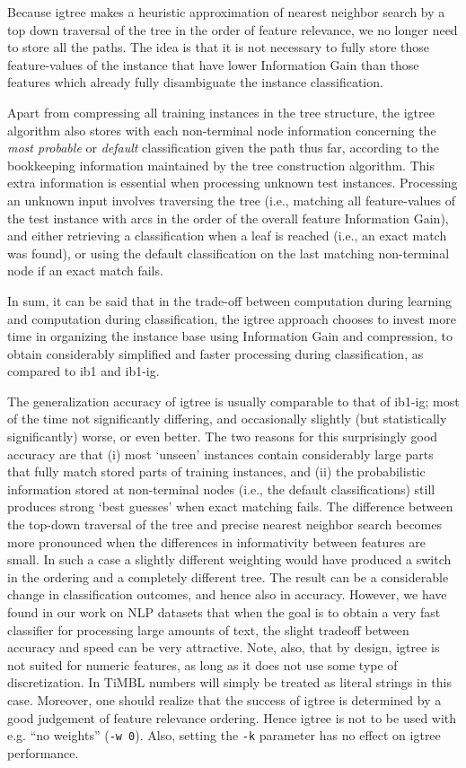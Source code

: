 \documentclass{report}
\begin{document}
Because {\sc igtree} makes a heuristic approximation of nearest
neighbor search by a top down traversal of the tree in the order of
feature relevance, we no longer need to store all the paths. The idea
is that it is not necessary to fully store those feature-values of the
instance that have lower Information Gain than those features which
already fully disambiguate the instance classification.

Apart from compressing all training instances in the tree structure,
the {\sc igtree} algorithm also stores with each non-terminal node
information concerning the {\em most probable} or {\em default}
classification given the path thus far, according to the bookkeeping
information maintained by the tree construction algorithm. This extra
information is essential when processing unknown test instances.
Processing an unknown input involves traversing the tree (i.e.,
matching all feature-values of the test instance with arcs in the
order of the overall feature Information Gain), and either retrieving
a classification when a leaf is reached (i.e., an exact match was
found), or using the default classification on the last matching
non-terminal node if an exact match fails.

In sum, it can be said that in the trade-off between computation
during learning and computation during classification, the {\sc
igtree} approach chooses to invest more time in organizing the
instance base using Information Gain and compression, to obtain
considerably simplified and faster processing during classification,
as compared to {\sc ib1} and {\sc ib1-ig}.
 
The generalization accuracy of {\sc igtree} is usually comparable to
that of {\sc ib1-ig}; most of the time not significantly differing,
and occasionally slightly (but statistically significantly) worse, or
even better.  The two reasons for this surprisingly good accuracy are
that (i) most `unseen' instances contain considerably large parts that
fully match stored parts of training instances, and (ii) the
probabilistic information stored at non-terminal nodes (i.e., the
default classifications) still produces strong `best guesses' when
exact matching fails. The difference between the top-down traversal of
the tree and precise nearest neighbor search becomes more pronounced
when the differences in informativity between features are small. In
such a case a slightly different weighting would have produced a
switch in the ordering and a completely different tree. The result can
be a considerable change in classification outcomes, and hence also in
accuracy. However, we have found in our work on NLP datasets that when
the goal is to obtain a very fast classifier for processing large
amounts of text, the slight tradeoff between accuracy and speed can be
very attractive. Note, also, that by design, {\sc igtree} is not
suited for numeric features, as long as it does not use some type of
discretization. In TiMBL numbers will simply be treated as literal
strings in this case. Moreover, one should realize that the success of
{\sc igtree} is determined by a good judgement of feature relevance
ordering. Hence {\sc igtree} is not to be used with e.g. ``no
weights'' ({\tt -w 0}). Also, setting the {\tt -k} parameter has no
effect on {\sc igtree} performance.
\end{document}
